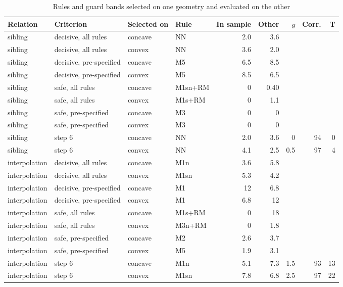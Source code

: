 \documentclass[pdflatex,sn-basic]{sn-jnl}
\newcommand{\tabsizesmall}{\footnotesize}
\begin{document}
\begin{table}[p]
\tabsizesmall
\setlength{\tabcolsep}{2.4pt}
\caption{Rules and guard bands selected on one geometry and evaluated on the other}\label{tab:s-crossfit}
\begin{tabular}{@{}llllrrrrr@{}}
\toprule
Relation & Criterion & Selected on & Rule & In sample & Other & $g$ & Corr. & T \\
\midrule
sibling & decisive, all rules & concave & NN & 2.0 & 3.6 & & & \\
sibling & decisive, all rules & convex & NN & 3.6 & 2.0 & & & \\
sibling & decisive, pre-specified & concave & M5 & 6.5 & 8.5 & & & \\
sibling & decisive, pre-specified & convex & M5 & 8.5 & 6.5 & & & \\
sibling & safe, all rules & concave & M1sn+RM & 0 & 0.40 & & & \\
sibling & safe, all rules & convex & M1s+RM & 0 & 1.1 & & & \\
sibling & safe, pre-specified & concave & M3 & 0 & 0 & & & \\
sibling & safe, pre-specified & convex & M3 & 0 & 0 & & & \\
sibling & step 6 & concave & NN & 2.0 & 3.6 & 0 & 94 & 0 \\
sibling & step 6 & convex & NN & 4.1 & 2.5 & 0.5 & 97 & 4 \\
interpolation & decisive, all rules & concave & M1n & 3.6 & 5.8 & & & \\
interpolation & decisive, all rules & convex & M1sn & 5.3 & 4.2 & & & \\
interpolation & decisive, pre-specified & concave & M1 & 12 & 6.8 & & & \\
interpolation & decisive, pre-specified & convex & M1 & 6.8 & 12 & & & \\
interpolation & safe, all rules & concave & M1s+RM & 0 & 18 & & & \\
interpolation & safe, all rules & convex & M3n+RM & 0 & 1.8 & & & \\
interpolation & safe, pre-specified & concave & M2 & 2.6 & 3.7 & & & \\
interpolation & safe, pre-specified & convex & M5 & 1.9 & 3.1 & & & \\
interpolation & step 6 & concave & M1n & 5.1 & 7.3 & 1.5 & 93 & 13 \\
interpolation & step 6 & convex & M1sn & 7.8 & 6.8 & 2.5 & 97 & 22 \\

\end{tabular}
\end{table}
\end{document}
